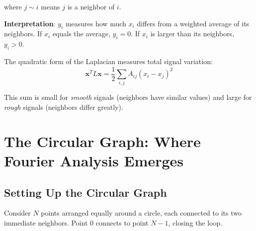 \begin{notechapter}
where $j \sim i$ means $j$ is a neighbor of $i$.

\textbf{Interpretation}: $y_i$ measures how much $x_i$ differs from a 
weighted average of its neighbors. If $x_i$ equals the average, 
$y_i = 0$. If $x_i$ is larger than its neighbors, $y_i > 0$.

\begin{proposition}
The quadratic form of the Laplacian measures total signal variation:
\begin{equation}
\mathbf{x}^T L \mathbf{x} = \frac{1}{2} \sum_{i,j} A_{ij}(x_i - x_j)^2
\end{equation}
\end{proposition}

This sum is small for \emph{smooth} signals (neighbors have similar 
values) and large for \emph{rough} signals (neighbors differ greatly).

\section{The Circular Graph: Where Fourier Analysis Emerges}

\subsection{Setting Up the Circular Graph}

Consider $N$ points arranged equally around a circle, each connected 
to its two immediate neighbors. Point $0$ connects to point $N-1$, 
closing the loop.

\begin{figure}[H]
\centering
{}
\end{figure}
\end{notechapter}
